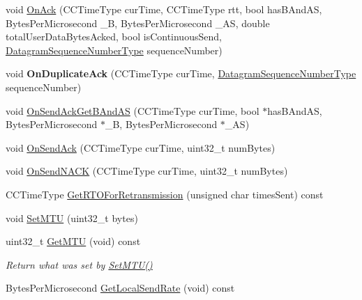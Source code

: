 \begin{DoxyCompactItemize}
\item 
void \hyperlink{class_rak_net_1_1_c_c_rak_net_sliding_window_aac0288a827f1a61435a48faed9a09cb9}{On\-Ack} (C\-C\-Time\-Type cur\-Time, C\-C\-Time\-Type rtt, bool has\-B\-And\-A\-S, Bytes\-Per\-Microsecond \-\_\-\-B, Bytes\-Per\-Microsecond \-\_\-\-A\-S, double total\-User\-Data\-Bytes\-Acked, bool is\-Continuous\-Send, \hyperlink{struct_rak_net_1_1uint24__t}{Datagram\-Sequence\-Number\-Type} sequence\-Number)
\item 
\hypertarget{class_rak_net_1_1_c_c_rak_net_sliding_window_a2ae0e36a277fcbbcb4bd97d23b8c3263}{void {\bfseries On\-Duplicate\-Ack} (C\-C\-Time\-Type cur\-Time, \hyperlink{struct_rak_net_1_1uint24__t}{Datagram\-Sequence\-Number\-Type} sequence\-Number)}\label{class_rak_net_1_1_c_c_rak_net_sliding_window_a2ae0e36a277fcbbcb4bd97d23b8c3263}

\item 
void \hyperlink{class_rak_net_1_1_c_c_rak_net_sliding_window_a5b0d43355d169c617b3e52a8e1fa72fb}{On\-Send\-Ack\-Get\-B\-And\-A\-S} (C\-C\-Time\-Type cur\-Time, bool $\ast$has\-B\-And\-A\-S, Bytes\-Per\-Microsecond $\ast$\-\_\-\-B, Bytes\-Per\-Microsecond $\ast$\-\_\-\-A\-S)
\item 
void \hyperlink{class_rak_net_1_1_c_c_rak_net_sliding_window_a9a102c6aa261d422ee4b3fc40710710c}{On\-Send\-Ack} (C\-C\-Time\-Type cur\-Time, uint32\-\_\-t num\-Bytes)
\item 
void \hyperlink{class_rak_net_1_1_c_c_rak_net_sliding_window_af2495a5ae77a57b1533cfcb655eb55ae}{On\-Send\-N\-A\-C\-K} (C\-C\-Time\-Type cur\-Time, uint32\-\_\-t num\-Bytes)
\item 
C\-C\-Time\-Type \hyperlink{class_rak_net_1_1_c_c_rak_net_sliding_window_af5f3efc0cf3a9d155a5ab6a3b4a7a632}{Get\-R\-T\-O\-For\-Retransmission} (unsigned char times\-Sent) const 
\item 
void \hyperlink{class_rak_net_1_1_c_c_rak_net_sliding_window_a44df5ef0a3d2936282a13e63972e1302}{Set\-M\-T\-U} (uint32\-\_\-t bytes)
\item 
\hypertarget{class_rak_net_1_1_c_c_rak_net_sliding_window_a2d9d16951f82d09b3e858d765f69c169}{uint32\-\_\-t \hyperlink{class_rak_net_1_1_c_c_rak_net_sliding_window_a2d9d16951f82d09b3e858d765f69c169}{Get\-M\-T\-U} (void) const }\label{class_rak_net_1_1_c_c_rak_net_sliding_window_a2d9d16951f82d09b3e858d765f69c169}

\begin{DoxyCompactList}\small\item\em Return what was set by \hyperlink{class_rak_net_1_1_c_c_rak_net_sliding_window_a44df5ef0a3d2936282a13e63972e1302}{Set\-M\-T\-U()} \end{DoxyCompactList}\item 
\hypertarget{class_rak_net_1_1_c_c_rak_net_sliding_window_a2862f2561b92b12fb44b04803cf54a72}{Bytes\-Per\-Microsecond \hyperlink{class_rak_net_1_1_c_c_rak_net_sliding_window_a2862f2561b92b12fb44b04803cf54a72}{Get\-Local\-Send\-Rate} (void) const }\label{class_rak_net_1_1_c_c_rak_net_sliding_window_a2862f2561b92b12fb44b04803cf54a72}


\end{DoxyCompactItemize}
